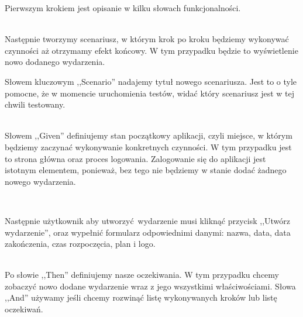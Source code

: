 Pierwszym krokiem jest opisanie w kilku słowach funkcjonalności.
\begin{code}
	
\end{code}\\

Następnie tworzymy scenariusz, w którym krok po kroku będziemy wykonywać czynności aż otrzymamy efekt końcowy. W tym przypadku będzie to wyświetlenie nowo dodanego wydarzenia.

Słowem kluczowym ,,Scenario'' nadajemy tytuł nowego scenariusza. Jest to o tyle pomocne, że w momencie uruchomienia testów, widać który scenariusz jest w tej chwili testowany.

\begin{code}
	
\end{code}\\

Słowem ,,Given'' definiujemy stan początkowy aplikacji, czyli miejsce, w którym będziemy zaczynać wykonywanie konkretnych czynności. W tym przypadku jest to strona główna oraz proces logowania. Zalogowanie się do aplikacji jest istotnym elementem, ponieważ, bez tego nie będziemy w stanie dodać żadnego nowego wydarzenia.

\begin{code}
	
\end{code}\\

\clearpage

Następnie użytkownik aby utworzyć wydarzenie musi kliknąć przycisk ,,Utwórz wydarzenie'', oraz wypełnić formularz odpowiednimi danymi: nazwa, data, data zakończenia, czas rozpoczęcia, plan i logo.

\begin{code}
	
\end{code}\\

Po słowie ,,Then'' definiujemy nasze oczekiwania. W tym przypadku chcemy zobaczyć nowo dodane wydarzenie wraz z jego wszystkimi właściwościami. Słowa ,,And'' używamy jeśli chcemy rozwinąć listę wykonywanych kroków lub listę oczekiwań.

\begin{code}
	
\end{code}\\

